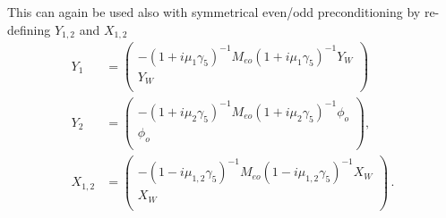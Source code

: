 This can again be used also with symmetrical even/odd preconditioning
by re-defining $Y_{1,2}$ and $X_{1,2}$
\begin{equation}
  \label{eq:mt7}
  \begin{split}
    Y_1 &= 
    \begin{pmatrix}
      -(1+i\mu_{1}\gamma_5)^{-1}M_{eo}(1+i\mu_{1}\gamma_5)^{-1}Y_W \\ Y_W\\
    \end{pmatrix}\, \\
    Y_2 &= 
    \begin{pmatrix}
      -(1+i\mu_{2}\gamma_5)^{-1}M_{eo}(1+i\mu_{2}\gamma_5)^{-1}\phi_o \\ \phi_o\\
    \end{pmatrix},\\
    X_{1,2} &= 
    \begin{pmatrix}
      -(1-i\mu_{1,2}\gamma_5)^{-1}M_{eo}(1-i\mu_{1,2}\gamma_5)^{-1}X_W \\ X_W\\
    \end{pmatrix}\, .\\
  \end{split}
\end{equation}

